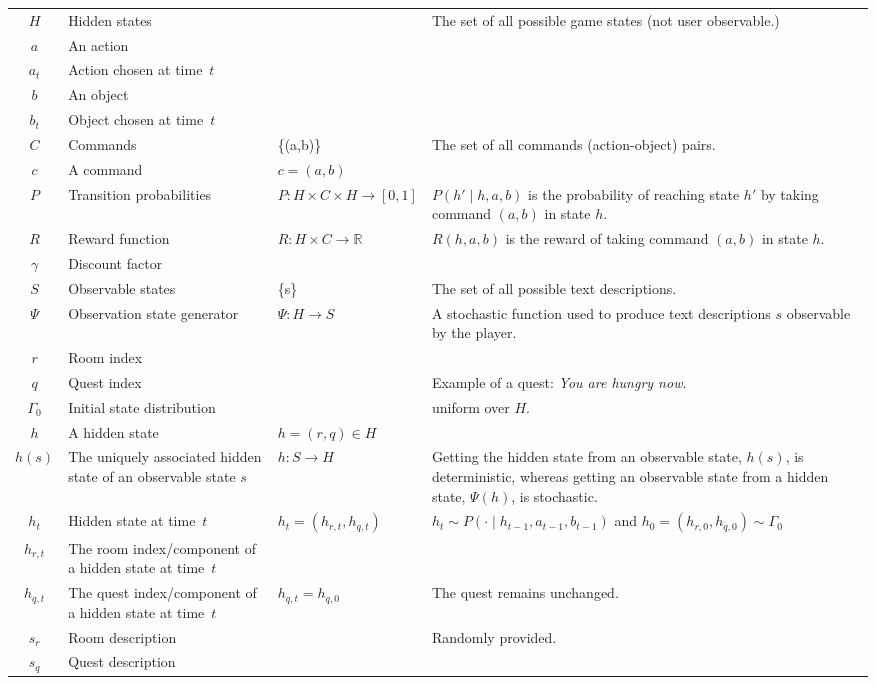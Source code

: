 \documentclass[11pt,a4paper]{article}
\begin{document}
\begin{small}
\begin{xltabular}{\textwidth}{@{} c >{\hsize\raggedright\arraybackslash}X >{\hsize\raggedright\arraybackslash}X >{\hsize\raggedright\arraybackslash}X @{}}
$H$ & Hidden states & & The set of all possible game states (not user observable.) \\
$a$ & An action & & \\
$a_t$ & Action chosen at time~$t$ & & \\
$b$ & An object & & \\
$b_t$ & Object chosen at time~$t$ & & \\
$C$ & Commands & \{(a,b)\} & The set of all commands (action-object) pairs. \\
$c$ & A command & $c=(a,b)$ & \\
$P$ & Transition probabilities & $P: H \times C \times H \to [0,1]$ & $P(h' \mid h,a,b)$ is the probability of reaching state $h'$ by taking command $(a,b)$ in state $h.$ \\
$R$ & Reward function & $R: H \times C \to \mathbb{R}$ & $R(h,a,b)$ is the reward of taking command $(a,b)$ in state $h.$ \\
$\gamma$ & Discount factor & & \\
$S$ & Observable states & \{s\} & The set of all possible text descriptions. \\
$\Psi$ & Observation state generator & $\Psi: H \to S$ & A stochastic function used to produce text descriptions $s$ observable by the player. \\
$r$ & Room index & & \\
$q$ & Quest index & & Example of a quest: \textit{You are hungry now}. \\
$\Gamma_0$ & Initial state distribution & & uniform over $H.$ \\
$h$ & A hidden state & $h=(r,q) \in H$ & \\
$h(s)$ & The uniquely associated hidden state of an observable state $s$ & $h: S \to H$ & Getting the hidden state from an observable state, $h(s)$, is deterministic, whereas getting an observable state from a hidden state, $\Psi(h)$, is stochastic. \\
$h_t$ & Hidden state at time~$t$ & $h_t=(h_{r,t},h_{q,t})$ & $h_t \sim P(\cdot \mid h_{t-1}, a_{t-1}, b_{t-1})$ and $h_0 = (h_{r,0}, h_{q,0}) \sim \Gamma_0$ \\
$h_{r,t}$ & The room index/component of a hidden state at time~$t$ & & \\
$h_{q,t}$ & The quest index/component of a hidden state at time~$t$ & $h_{q,t} = h_{q,0}$ & The quest remains unchanged. \\
$s_r$ & Room description & & Randomly provided. \\
$s_q$ & Quest description & & \\

\end{xltabular}
\end{small}
\end{document}
